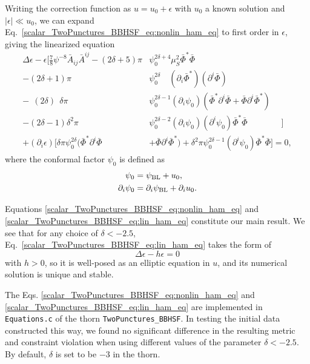 Writing the correction function as $u = u_0 + \epsilon$ with $u_0$ a known solution
and $|\epsilon|\ll u_0$, 
we can expand Eq.~\eqref{scalar_TwoPunctures_BBHSF_eq:nonlin_ham_eq}
to first order in $\epsilon$, giving
the linearized equation
\begin{align}
    \Delta\epsilon
    - \epsilon
    \Bigg[
        \frac{7}{8} \psi^{-8} \bar{A}_{ij} \bar{A}^{ij}
        - (2\delta + 5) \pi
        &\psi_0^{2\delta + 4}
        \mu_S^2 \bar{\Phi}^* \bar{\Phi}
        \nonumber
        \\
        - (2\delta + 1) \pi
        &\psi_0^{2\delta}\quad
        (\partial_i\bar{\Phi}^*)
        (\partial^i\bar{\Phi})
        \nonumber
        \\
        -\ \ (2\delta)\ \ \delta \pi
        &\psi_0^{2\delta-1} (\partial_i\psi_0)
        ( \bar{\Phi}^* \partial^i\bar{\Phi}
        + \bar{\Phi} \partial^i\bar{\Phi}^* )
        \nonumber
        \\
        - (2\delta-1) \delta^2 \pi
        &\psi_0^{2\delta-2}
        (\partial_i\psi_0) (\partial^i\psi_0)
        \bar{\Phi}^* \bar{\Phi}
    \quad\quad\quad\quad\Big]
    \nonumber
    \\
    + (\partial_i\epsilon)
    \Big[
        \delta \pi \psi_0^{2\delta}
        ( \bar{\Phi}^* \partial^i\bar{\Phi}
        &+ \bar{\Phi} \partial^i\bar{\Phi}^* )
        +
        \delta^2 \pi \psi_0^{2\delta-1} (\partial^i\psi_0)
        \bar{\Phi}^* \bar{\Phi}
    \Big]= 0,
    \label{scalar_TwoPunctures_BBHSF_eq:lin_ham_eq}
\end{align}
where the conformal factor $\psi_0$ is defined as
\begin{align}
    \psi_0
    &= \psi_{\rm BL} + u_0,
    \\
    \partial_i \psi_0
    &= \partial_i \psi_{\rm BL}
    + \partial_i u_0.
\end{align}

Equations \eqref{scalar_TwoPunctures_BBHSF_eq:nonlin_ham_eq} and
\eqref{scalar_TwoPunctures_BBHSF_eq:lin_ham_eq} constitute our main result.
We see that for any choice of $\delta < -2.5$,
Eq.~\eqref{scalar_TwoPunctures_BBHSF_eq:lin_ham_eq} takes the form of 
\begin{equation}
    \Delta \epsilon - h \epsilon = 0
\end{equation}
with $h>0$,
so it is well-posed as an elliptic equation in $u$,
and its numerical solution is unique and stable.

The Eqs. \eqref{scalar_TwoPunctures_BBHSF_eq:nonlin_ham_eq} and
\eqref{scalar_TwoPunctures_BBHSF_eq:lin_ham_eq}
are implemented in \texttt{Equations.c} of the thorn \texttt{TwoPunctures\_BBHSF}.
In testing the initial data constructed this way, we found no significant difference in
the resulting metric and constraint violation when using different values of
the parameter $\delta < -2.5$.
By default, $\delta$ is set to be $-3$ in the thorn.

